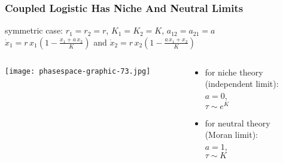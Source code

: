 \documentclass[dvipsnames]{beamer}
\begin{document}
\begin{frame}
\frametitle{Coupled Logistic Has Niche And Neutral Limits}
\begin{center}
symmetric case: $r_1=r_2=r$, $K_1=K_2=K$, $a_{12}=a_{21}=a$\\
\vspace{0.2cm}
$\dot{x}_1 = r\, x_1 \left( 1 - \frac{x_1 + a\, x_2}{K} \right)$ and $\dot{x}_2 = r\, x_2 \left( 1 - \frac{a\, x_1 + x_2}{K} \right)$\\
\end{center}
\vspace{-0.4cm}
\begin{columns}
	\begin{column}{6.5cm}
		\begin{center}
			\texttt{[image: phasespace-graphic-73.jpg]}
		\end{center}
	\end{column}
	\begin{column}{4.5cm}
		\begin{itemize}
			\item for niche theory \\(independent limit): \\$a=0$, \\$\tau \sim e^K$
			\item for neutral theory \\(Moran limit): \\$a=1$, \\$\tau \sim K$
		\end{itemize}
	\end{column}
\end{columns}
\end{frame}
\end{document}
